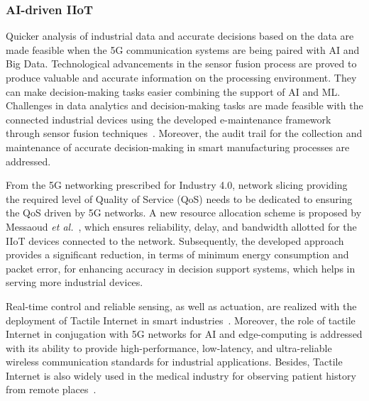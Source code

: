 \documentclass[journal]{IEEEtran}
\begin{document}
\subsubsection{AI-driven IIoT}

Quicker analysis of industrial data and accurate decisions based on the data are made feasible when the 5G communication systems are being paired with AI and Big Data. Technological advancements in the sensor fusion process are proved to produce valuable and accurate information on the processing environment. They can make decision-making tasks easier combining the support of AI and ML. Challenges in data analytics and decision-making tasks are made feasible with the connected industrial devices using the developed e-maintenance framework through sensor fusion techniques~\cite{turner_intelligent_2019}. Moreover, the audit trail for the collection and maintenance of accurate decision-making in smart manufacturing processes are addressed. 

From the 5G networking prescribed for Industry 4.0, network slicing providing the required level of Quality of Service (QoS) needs to be dedicated to ensuring the QoS driven by 5G networks. A new resource allocation scheme is proposed by Messaoud \textit{et al.}~\cite{messaoud_online_2020}, which ensures reliability, delay, and bandwidth allotted for the IIoT devices connected to the network. Subsequently, the developed approach provides a significant reduction, in terms of minimum energy consumption and packet error, for enhancing accuracy in decision support systems, which helps in serving more industrial devices.

Real-time control and reliable sensing, as well as actuation, are realized with the deployment of Tactile Internet in smart industries~\cite{aijaz_tactile_2019}. Moreover, the role of tactile Internet in conjugation with 5G networks for AI and edge-computing is addressed with its ability to provide high-performance, low-latency, and ultra-reliable wireless communication standards for industrial applications. Besides, Tactile Internet is also widely used in the medical industry for observing patient history from remote places~\cite{vora_tilaa_2019}.
\end{document}
